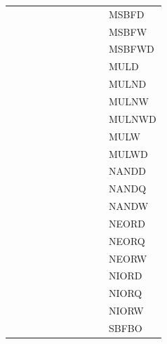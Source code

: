 {\begin{tabular}{|l|l|l|l|l|l|l|l|l|l|l|}
 & & & & & & & & & & \textsf{MSBFD} \\
 & & & & & & & & & & \textsf{MSBFW} \\
 & & & & & & & & & & \textsf{MSBFWD} \\
 & & & & & & & & & & \textsf{MULD} \\
 & & & & & & & & & & \textsf{MULND} \\
 & & & & & & & & & & \textsf{MULNW} \\
 & & & & & & & & & & \textsf{MULNWD} \\
 & & & & & & & & & & \textsf{MULW} \\
 & & & & & & & & & & \textsf{MULWD} \\
 & & & & & & & & & & \textsf{NANDD} \\
 & & & & & & & & & & \textsf{NANDQ} \\
 & & & & & & & & & & \textsf{NANDW} \\
 & & & & & & & & & & \textsf{NEORD} \\
 & & & & & & & & & & \textsf{NEORQ} \\
 & & & & & & & & & & \textsf{NEORW} \\
 & & & & & & & & & & \textsf{NIORD} \\
 & & & & & & & & & & \textsf{NIORQ} \\
 & & & & & & & & & & \textsf{NIORW} \\
 & & & & & & & & & & \textsf{SBFBO} \\
\hline\end{tabular}
}
\smallskip

